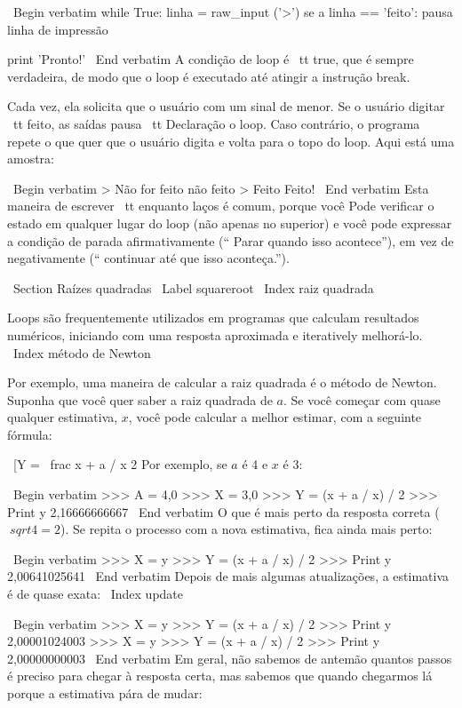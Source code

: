 \documentclass[10pt]{book}
\begin{document}
\begin {itemize}
{{{{\ Begin {verbatim}
while True:
    linha = raw_input ('>')
    se a linha == 'feito':
        pausa
    linha de impressão

print 'Pronto!'
\ End {verbatim}
%
A condição de loop é {\ tt true}, que é sempre verdadeira, de modo que o
loop é executado até atingir a instrução break.

Cada vez, ela solicita que o usuário com um sinal de menor.
Se o usuário digitar {\ tt feito}, as saídas {pausa \ tt} Declaração
o loop. Caso contrário, o programa repete o que quer que o usuário digita
e volta para o topo do loop. Aqui está uma amostra:

\ Begin {verbatim}
> Não for feito
não feito
> Feito
Feito!
\ End {verbatim}
%
Esta maneira de escrever {\ tt enquanto} laços é comum, porque você
Pode verificar o estado em qualquer lugar do loop (não apenas no
superior) e você pode expressar a condição de parada afirmativamente
(`` Parar quando isso acontece''), em vez de negativamente (`` continuar
até que isso aconteça.'').


\ Section {Raízes quadradas}
\ Label {} squareroot
\ Index {raiz quadrada}

Loops são frequentemente utilizados em programas que calculam
resultados numéricos, iniciando com uma resposta aproximada e
iteratively melhorá-lo.
\ Index {método de Newton}

Por exemplo, uma maneira de calcular a raiz quadrada é o método de Newton.
Suponha que você quer saber a raiz quadrada de $ a $. Se você começar
com quase qualquer estimativa, $ x $, você pode calcular a melhor
estimar, com a seguinte fórmula:

\ [Y = \ frac {x + a / x} {2} \]
%
Por exemplo, se $ a $ é 4 e $ x $ é 3:

\ Begin {verbatim}
>>> A = 4,0
>>> X = 3,0
>>> Y = (x + a / x) / 2
>>> Print y
2,16666666667
\ End {verbatim}
%
O que é mais perto da resposta correta ($ \ sqrt {4} = 2 $). Se
repita o processo com a nova estimativa, fica ainda mais perto:

\ Begin {verbatim}
>>> X = y
>>> Y = (x + a / x) / 2
>>> Print y
2,00641025641
\ End {verbatim}
%
Depois de mais algumas atualizações, a estimativa é de quase exata:
\ Index {update}

\ Begin {verbatim}
>>> X = y
>>> Y = (x + a / x) / 2
>>> Print y
2,00001024003
>>> X = y
>>> Y = (x + a / x) / 2
>>> Print y
2,00000000003
\ End {verbatim}
%
Em geral, não sabemos de antemão quantos passos é preciso
para chegar à resposta certa, mas sabemos que quando chegarmos lá
porque a estimativa
pára de mudar:

}}}}
\end{itemize}
\end{document}
